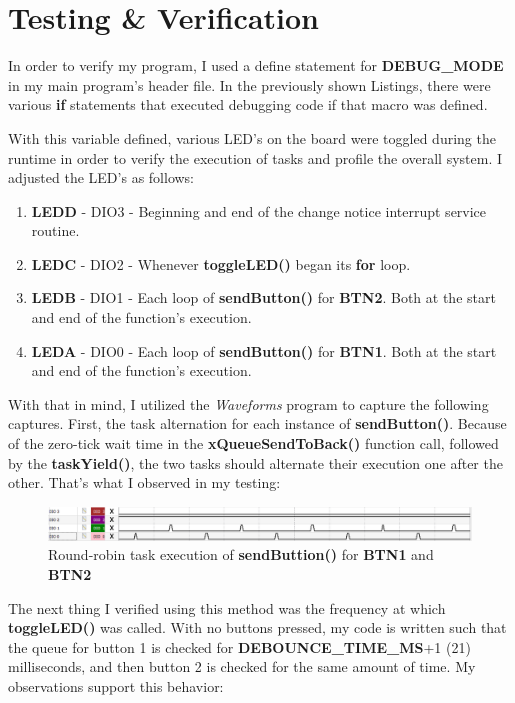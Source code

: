 \documentclass[a4paper, 12pt]{article}
\begin{document}
\section{Testing \& Verification}
In order to verify my program, I used a define statement for \textbf{DEBUG\_MODE} in my main program's header file. In the previously shown Listings, there were various \textbf{if} statements that executed debugging code if that macro was defined.

With this variable defined, various LED's on the board were toggled during the runtime in order to verify the execution of tasks and profile the overall system. I adjusted the LED's as follows:
\begin{enumerate}
\item \textbf{LEDD} - DIO3 - Beginning and end of the change notice interrupt service routine.
\item \textbf{LEDC} - DIO2 - Whenever \textbf{toggleLED()} began its \textbf{for} loop.
\item \textbf{LEDB} - DIO1 - Each loop of \textbf{sendButton()} for \textbf{BTN2}. Both at the start and end of the function's execution.
\item \textbf{LEDA} - DIO0 - Each loop of \textbf{sendButton()} for \textbf{BTN1}. Both at the start and end of the function's execution.
\end{enumerate}

With that in mind, I utilized the \textit{Waveforms} program to capture the following captures. First, the task alternation for each instance of \textbf{sendButton()}. Because of the zero-tick wait time in the \textbf{xQueueSendToBack()} function call, followed by the \textbf{taskYield()}, the two tasks should alternate their execution one after the other. That's what I observed in my testing:
	
\begin{figure}[H]
\centering
\includegraphics[width=1\textwidth]{img00.png}
\caption{Round-robin task execution of \textbf{sendButtion()} for \textbf{BTN1} and \textbf{BTN2}}
\label{fig:img00}
\end{figure}

The next thing I verified using this method was the frequency at which \textbf{toggleLED()} was called. With no buttons pressed, my code is written such that the queue for button 1 is checked for \textbf{DEBOUNCE\_TIME\_MS}+1 (21) milliseconds, and then button 2 is checked for the same amount of time. My observations support this behavior:
\end{document}
